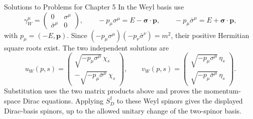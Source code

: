 \begin{bankssolutions}{Solutions to Problems for Chapter 5}
In the Weyl basis use
\begin{equation*}
 \gamma_W^\mu=\begin{pmatrix}0&\sigma^\mu\\\bar\sigma^\mu&0\end{pmatrix},
  \qquad
  -p_\mu\sigma^\mu=E-\boldsymbol\sigma\cdot\mathbf p,
  \qquad
  -p_\mu\bar\sigma^\mu=E+\boldsymbol\sigma\cdot\mathbf p,
\end{equation*}
with $p_\mu=(-E,\mathbf p)$. Since
$(-p_\mu\sigma^\mu)(-p_\nu\bar\sigma^\nu)=m^2$, their positive Hermitian square roots
exist. The two independent solutions are
\begin{equation*}
 u_W(p,s)=\begin{pmatrix}
  \sqrt{-p_\mu\sigma^\mu}\,\chi_s\\[2pt]
  -\sqrt{-p_\mu\bar\sigma^\mu}\,\chi_s
 \end{pmatrix},
 \qquad
 v_W(p,s)=\begin{pmatrix}
  \sqrt{-p_\mu\sigma^\mu}\,\eta_s\\[2pt]
  \sqrt{-p_\mu\bar\sigma^\mu}\,\eta_s
 \end{pmatrix}.
\end{equation*}
Substitution uses the two matrix products above and proves the momentum-space
Dirac equations. Applying $S_D^\dagger$ to these Weyl spinors gives the displayed
Dirac-basis spinors, up to the allowed unitary change of the two-spinor basis.


\end{bankssolutions}

